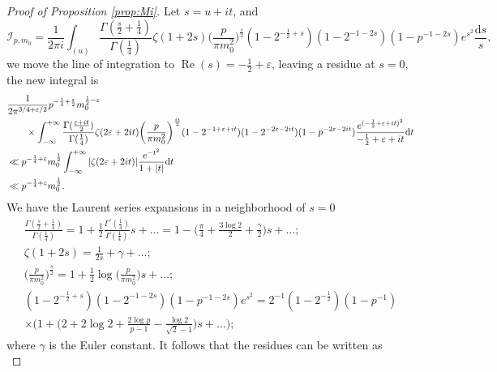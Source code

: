 \documentclass[10pt,a4paper]{amsart}
\renewcommand{\Re}{\operatorname{Re}}
\newcommand{\dd}{\mathrm{d}}
\begin{document}
\begin{proof}[Proof of Proposition \ref{prop:Mi}]
Let $s=u+it$, and
\begin{equation*}
  \mathcal{I}_{p,m_0}=\frac{1}{2\pi i}
  \int_{(u)}
\frac{\Gamma(\frac{s}{2}+\frac{1}{4})}
{\Gamma(\frac{1}{4})}
\zeta(1+2s)
\bigg(\frac{p}{\pi m_0^2}\bigg)^{\frac{s}{2}}
(1-2^{-\frac{1}{2}+s})
(1-2^{-1-2s})
(1-p^{-1-2s})
e^{s^2}\frac{\dd s}{s},
\end{equation*}
we move the line of integration to $\Re(s)=-\frac{1}{2}+\varepsilon$,
leaving a residue at $s=0$,
the new integral is
\begin{equation*}
\begin{split}
  &\frac{1}{2 \pi^{3/4 + \varepsilon/2}}
  p^{-\frac{1}{4}+\frac{\varepsilon}{2}} m_0^{\frac{1}{2}-\varepsilon}\\
&\hskip 20pt\times
\int_{-\infty}^{+\infty}
\frac{\Gamma(\frac{\varepsilon+it}{2})}
{\Gamma(\frac{1}{4})}
\zeta(2\varepsilon+2it)
\bigg(\frac{p}{\pi m_0^2}\bigg)^{\frac{it}{2}}
(1-2^{-1+\varepsilon+it})
(1-2^{-2\varepsilon-2it})
(1-p^{-2\varepsilon-2it})
\frac{e^{(-\frac{1}{2}+\varepsilon+it)^2}}
{-\frac{1}{2}+\varepsilon+it}\dd t\\
&\ll p^{-\frac{1}{4}+\varepsilon}
m_0^{\frac{1}{2}}
\int_{-\infty}^{+\infty}
|\zeta(2\varepsilon+2it)|
\frac{e^{-t^2}}{1+|t|} \dd t\\
&\ll p^{-\frac{1}{4}+\varepsilon}
m_0^{\frac{1}{2}}.
\end{split}
\end{equation*}
We have the Laurent series expansions in a neighborhood of $s=0$
\begin{equation*}
\begin{gathered}
\frac{\Gamma(\frac{s}{2}+\frac{1}{4})}
{\Gamma(\frac{1}{4})}
=1+\frac{1}{2}\frac{\Gamma^{'}(\frac{1}{4})}
{\Gamma(\frac{1}{4})}s+\dots
=1-\bigg(\frac{\pi}{4}+\frac{3\log 2}{2} +\frac{\gamma}{2}\bigg)s+\dots;\\
\zeta(1+2s)=\frac{1}{2s}+\gamma+\dots;\\
\bigg(\frac{p}{\pi m_0^2}\bigg)
^{\frac{s}{2}}=1+\frac{1}{2}
\log\bigg(\frac{p}{\pi m_0^2}\bigg)s+\dots;\\
(1-2^{-\frac{1}{2}+s})
(1-2^{-1-2s})
(1-p^{-1-2s})
e^{s^2}
=2^{-1}(1-2^{-\frac{1}{2}})
(1-p^{-1})
\\ \times
\bigg(1+\bigg(2+2\log 2+\frac{2\log p}{p-1}-\frac{\log 2}{\sqrt{2}-1}\bigg)s+\dots\bigg);
\end{gathered}
\end{equation*}
where $\gamma$ is the Euler constant.
It follows that the residues can be written as
\begin{equation}\label{eq:residue}

\end{equation}
\end{proof}
\end{document}
